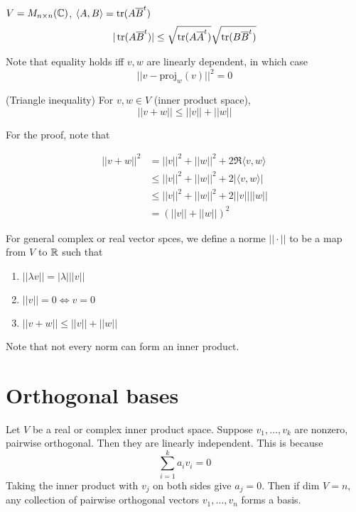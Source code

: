\documentclass[12pt]{article}
\begin{document}
\begin{ex}
	$V = M_{n\times n}(\mathbb{C})$, $\langle A,B \rangle = \operatorname{tr}(A\overline{B}^t)$
	$$|\operatorname{tr}(A\overline{B}^t)| \leq \sqrt{\operatorname{tr}(A\overline{A}^t)}\sqrt{\operatorname{tr}(B\overline{B}^t)}$$
\end{ex}

Note that equality holds iff $v,w$ are linearly dependent, in which case
$$||v-\text{proj}_w(v)||^2 = 0$$

\begin{thm}
	(Triangle inequality) For $v,w \in V$ (inner product space),
	$$||v+w|| \leq ||v|| + ||w||$$
\end{thm}

For the proof, note that

\begin{align*}
	||v+w||^2 &= ||v||^2 + ||w||^2 + 2\Re\langle v,w \rangle \\
		  &\leq ||v||^2 + ||w||^2 + 2|\langle v,w \rangle| \\
		  &\leq ||v||^2 + ||w||^2 + 2||v|| ||w|| \\
		  &= (||v||+||w||)^2
\end{align*}

\begin{defn}
	For general complex or real vector spces, we define a norme $||\cdot||$ to be a map from $V$ to $\mathbb{R}$ such that
	\begin{enumerate}
		\item $||\lambda v|| = |\lambda| ||v||$
		\item $||v||=0 \Leftrightarrow v=0$
		\item $||v+w|| \leq ||v|| + ||w||$
	\end{enumerate}
\end{defn}

Note that not every norm can form an inner product.

\section{Orthogonal bases}

Let $V$ be a real or complex inner product space. Suppose $v_1,\dots,v_k$ are nonzero, pairwise orthogonal. Then they are linearly independent. This is because
$$\sum_{i=1}^k a_iv_i = 0$$
Taking the inner product with $v_j$ on both sides give $a_j=0$. Then if dim $V=n$, any collection of pairwise orthogonal vectors $v_1,\dots,v_n$ forms a basis.
\end{document}

